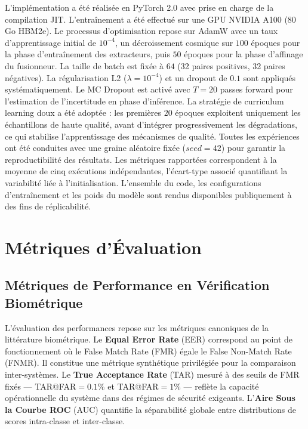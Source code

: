 \documentclass[12pt,a4paper]{report}
\begin{document}
L'impl\'{e}mentation a \'{e}t\'{e} r\'{e}alis\'{e}e en PyTorch 2.0 avec prise en charge de la compilation JIT. L'entra\^{i}nement a \'{e}t\'{e} effectu\'{e} sur une GPU NVIDIA A100 (80 Go HBM2e). Le processus d'optimisation repose sur AdamW avec un taux d'apprentissage initial de $10^{-4}$, un d\'{e}croissement cosmique sur $100$ \'{e}poques pour la phase d'entra\^{i}nement des extracteurs, puis $50$ \'{e}poques pour la phase d'affinage du fusionneur. La taille de batch est fix\'{e}e \`{a} $64$ (32 paires positives, 32 paires n\'{e}gatives). La r\'{e}gularisation L2 ($\lambda = 10^{-4}$) et un dropout de $0.1$ sont appliqu\'{e}s syst\'{e}matiquement. Le MC Dropout est activ\'{e} avec $T = 20$ passes forward pour l'estimation de l'incertitude en phase d'inf\'{e}rence. La strat\'{e}gie de curriculum learning doux a \'{e}t\'{e} adopt\'{e}e : les premi\`{e}res $20$ \'{e}poques exploitent uniquement les \'{e}chantillons de haute qualit\'{e}, avant d'int\'{e}grer progressivement les d\'{e}gradations, ce qui stabilise l'apprentissage des m\'{e}canismes de qualit\'{e}. Toutes les exp\'{e}riences ont \'{e}t\'{e} conduites avec une graine al\'{e}atoire fix\'{e}e ($seed = 42$) pour garantir la reproductibilit\'{e} des r\'{e}sultats. Les m\'{e}triques rapport\'{e}es correspondent \`{a} la moyenne de cinq ex\'{e}cutions ind\'{e}pendantes, l'\'{e}cart-type associ\'{e} quantifiant la variabilit\'{e} li\'{e}e \`{a} l'initialisation. L'ensemble du code, les configurations d'entra\^{i}nement et les poids du mod\`{e}le sont rendus disponibles publiquement \`{a} des fins de r\'{e}plicabilit\'{e}.

\section{M\'{e}triques d'\'{E}valuation}
\label{sec:metriques}

\subsection{M\'{e}triques de Performance en V\'{e}rification Biom\'{e}trique}

L'\'{e}valuation des performances repose sur les m\'{e}triques canoniques de la litt\'{e}rature biom\'{e}trique. Le \textbf{Equal Error Rate} (EER) correspond au point de fonctionnement o\`{u} le False Match Rate (FMR) \'{e}gale le False Non-Match Rate (FNMR). Il constitue une m\'{e}trique synth\'{e}tique privil\'{e}gi\'{e}e pour la comparaison inter-syst\`{e}mes. Le \textbf{True Acceptance Rate} (TAR) mesur\'{e} \`{a} des seuils de FMR fix\'{e}s --- TAR@FAR$=0.1\%$ et TAR@FAR$=1\%$ --- refl\`{e}te la capacit\'{e} op\'{e}rationnelle du syst\`{e}me dans des r\'{e}gimes de s\'{e}curit\'{e} exigeants. L'\textbf{Aire Sous la Courbe ROC} (AUC) quantifie la s\'{e}parabilit\'{e} globale entre distributions de scores intra-classe et inter-classe.
\end{document}
